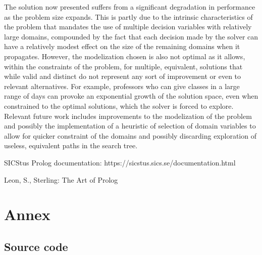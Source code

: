 \documentclass{llncs}
\begin{document}
The solution now presented suffers from a significant degradation in performance as the problem size expands. This is partly due to the intrinsic characteristics of the problem that mandates the use of multiple decision variables with  relatively large domains, compounded by the fact that each decision made by the solver can have a relatively modest effect on the size of the remaining domains when it propagates. However, the modelization chosen is also not optimal as it allows, within the constraints of the problem, for multiple, equivalent, solutions that while valid and distinct do not represent any sort of improvement or even to relevant alternatives. For example, professors who can give classes in a large range of days can provoke an exponential growth of the solution space, even when constrained to the optimal solutions, which the solver is forced to explore. Relevant future work includes improvements to the modelization of the problem and possibly the implementation of a heuristic of selection of domain variables to allow for quicker constraint of the domains and possibly discarding exploration of useless, equivalent paths in the search tree.
 
%
%
\begin{thebibliography}{2}
%


SICStus Prolog documentation:
https://sicstus.sics.se/documentation.html

Leon, S., Sterling:
The Art of Prolog

\end{thebibliography}

\section{Annex}

\subsection{Source code}
\end{document}
